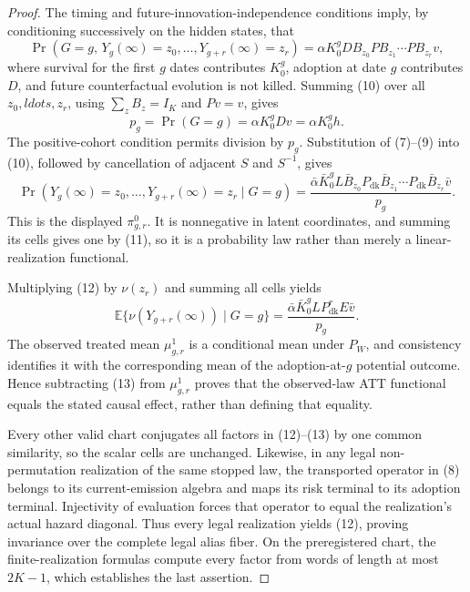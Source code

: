 \documentclass{article}
\begin{document}
\begin{proof}
The timing and future-innovation-independence conditions imply, by conditioning successively on the hidden states, that
\[
 \Pr\!\left(G=g,\,Y_g(\infty)=z_0,\ldots,Y_{g+r}(\infty)=z_r\right)
 =\alpha K_0^gDB_{z_0}PB_{z_1}\cdots PB_{z_r}v,               \tag{10}
\]
where survival for the first \(g\) dates contributes \(K_0^g\), adoption at date \(g\) contributes \(D\), and future counterfactual evolution is not killed.  Summing (10) over all \(z_0,ldots,z_r\), using \(\sum_zB_z=I_K\) and \(Pv=v\), gives
\[
 p_g=\Pr(G=g)=\alpha K_0^gDv=\alpha K_0^gh.                  \tag{11}
\]
The positive-cohort condition permits division by \(p_g\).  Substitution of (7)--(9) into (10), followed by cancellation of adjacent \(S\) and \(S^{-1}\), gives
\[
 \Pr\!\left(Y_g(\infty)=z_0,\ldots,Y_{g+r}(\infty)=z_r\mid G=g\right)
 =\frac{\bar\alpha\bar K_0^gL\bar B_{z_0}P_{\mathrm{dk}}\bar B_{z_1}\cdots P_{\mathrm{dk}}\bar B_{z_r}\bar v}{p_g}. \tag{12}
\]
This is the displayed \(\pi^0_{g,r}\).  It is nonnegative in latent coordinates, and summing its cells gives one by (11), so it is a probability law rather than merely a linear-realization functional.

Multiplying (12) by \(\nu(z_r)\) and summing all cells yields
\[
 \mathbb E\{\nu(Y_{g+r}(\infty))\mid G=g\}
 =\frac{\bar\alpha\bar K_0^gLP_{\mathrm{dk}}^rE\bar v}{p_g}.
                                                                    \tag{13}
\]
The observed treated mean \(\mu^1_{g,r}\) is a conditional mean under \(P_W\), and consistency identifies it with the corresponding mean of the adoption-at-\(g\) potential outcome.  Hence subtracting (13) from \(\mu^1_{g,r}\) proves that the observed-law ATT functional equals the stated causal effect, rather than defining that equality.

Every other valid chart conjugates all factors in (12)--(13) by one common similarity, so the scalar cells are unchanged.  Likewise, in any legal non-permutation realization of the same stopped law, the transported operator in (8) belongs to its current-emission algebra and maps its risk terminal to its adoption terminal.  Injectivity of evaluation forces that operator to equal the realization's actual hazard diagonal.  Thus every legal realization yields (12), proving invariance over the complete legal alias fiber.  On the preregistered chart, the finite-realization formulas compute every factor from words of length at most \(2K-1\), which establishes the last assertion.
\end{proof}
\end{document}
